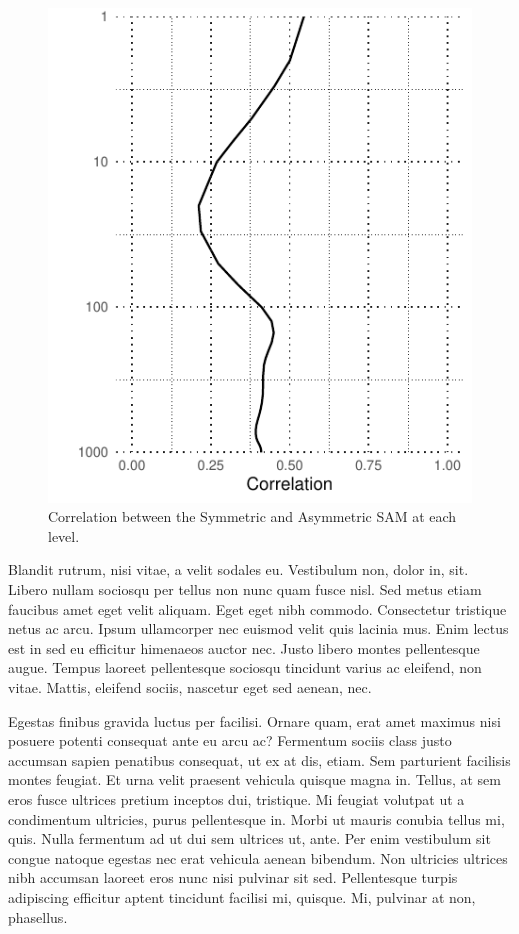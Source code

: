 \documentclass[twocol]{ametsocV5}
\begin{document}
\begin{figure}
\includegraphics{cor-lev-1} \caption[Correlation between the Symmetric and Asymmetric SAM at each level]{Correlation between the Symmetric and Asymmetric SAM at each level.}\label{fig:cor-lev}
\end{figure}

Blandit rutrum, nisi vitae, a velit sodales eu. Vestibulum non, dolor
in, sit. Libero nullam sociosqu per tellus non nunc quam fusce nisl. Sed
metus etiam faucibus amet eget velit aliquam. Eget eget nibh commodo.
Consectetur tristique netus ac arcu. Ipsum ullamcorper nec euismod velit
quis lacinia mus. Enim lectus est in sed eu efficitur himenaeos auctor
nec. Justo libero montes pellentesque augue. Tempus laoreet pellentesque
sociosqu tincidunt varius ac eleifend, non vitae. Mattis, eleifend
sociis, nascetur eget sed aenean, nec.

Egestas finibus gravida luctus per facilisi. Ornare quam, erat amet
maximus nisi posuere potenti consequat ante eu arcu ac? Fermentum sociis
class justo accumsan sapien penatibus consequat, ut ex at dis, etiam.
Sem parturient facilisis montes feugiat. Et urna velit praesent vehicula
quisque magna in. Tellus, at sem eros fusce ultrices pretium inceptos
dui, tristique. Mi feugiat volutpat ut a condimentum ultricies, purus
pellentesque in. Morbi ut mauris conubia tellus mi, quis. Nulla
fermentum ad ut dui sem ultrices ut, ante. Per enim vestibulum sit
congue natoque egestas nec erat vehicula aenean bibendum. Non ultricies
ultrices nibh accumsan laoreet eros nunc nisi pulvinar sit sed.
Pellentesque turpis adipiscing efficitur aptent tincidunt facilisi mi,
quisque. Mi, pulvinar at non, phasellus.
\end{document}
